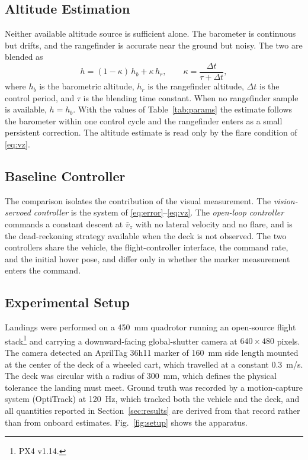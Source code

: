 \subsection{Altitude Estimation}

Neither available altitude source is sufficient alone. The barometer is continuous but
drifts, and the rangefinder is accurate near the ground but noisy. The two are blended as
%
\begin{equation}
  h = (1 - \kappa)\, h_{b} + \kappa\, h_{r},
  \qquad
  \kappa = \frac{\Delta t}{\tau + \Delta t},
  \label{eq:alt}
\end{equation}
%
where $h_{b}$ is the barometric altitude, $h_{r}$ is the rangefinder altitude, $\Delta t$
is the control period, and $\tau$ is the blending time constant. When no rangefinder
sample is available, $h = h_{b}$. With the values of Table~\ref{tab:params} the estimate
follows the barometer within one control cycle and the rangefinder enters as a small
persistent correction. The altitude estimate is read only by the flare condition of
\eqref{eq:vz}.


\subsection{Baseline Controller}

The comparison isolates the contribution of the visual measurement. The
\emph{vision-servoed controller} is the system of \eqref{eq:error}--\eqref{eq:vz}. The
\emph{open-loop controller} commands a constant descent at $\bar{v}_{z}$ with no lateral
velocity and no flare, and is the dead-reckoning strategy available when the deck is not
observed. The two controllers share the vehicle, the flight-controller interface, the
command rate, and the initial hover pose, and differ only in whether the marker
measurement enters the command.

\subsection{Experimental Setup}

Landings were performed on a 450~mm quadrotor running an open-source flight
stack\footnote{PX4 v1.14.} and carrying a downward-facing global-shutter camera at
$640 \times 480$ pixels. The camera detected an AprilTag 36h11 marker of 160~mm side
length mounted at the center of the deck of a wheeled cart, which travelled at a constant
0.3~m/s. The deck was circular with a radius of 300~mm, which defines the physical
tolerance the landing must meet. Ground truth was recorded by a motion-capture system
(OptiTrack) at 120~Hz, which tracked both the vehicle and the deck, and all quantities
reported in Section~\ref{sec:results} are derived from that record rather than from
onboard estimates. Fig.~\ref{fig:setup} shows the apparatus.

